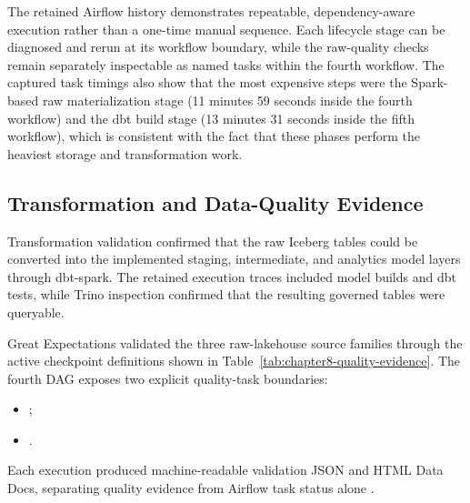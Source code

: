 The retained Airflow history demonstrates repeatable, dependency-aware execution rather than a one-time manual sequence. Each lifecycle stage can be diagnosed and rerun at its workflow boundary, while the raw-quality checks remain separately inspectable as named tasks within the fourth workflow. The captured task timings also show that the most expensive steps were the Spark-based raw materialization stage (11 minutes 59 seconds inside the fourth workflow) and the dbt build stage (13 minutes 31 seconds inside the fifth workflow), which is consistent with the fact that these phases perform the heaviest storage and transformation work.

\subsection*{Transformation and Data-Quality Evidence}
Transformation validation confirmed that the raw Iceberg tables could be converted into the implemented staging, intermediate, and analytics model layers through dbt-spark. The retained execution traces included model builds and dbt tests, while Trino inspection confirmed that the resulting governed tables were queryable.

Great Expectations validated the three raw-lakehouse source families through the active checkpoint definitions shown in Table~\ref{tab:chapter8-quality-evidence}. The fourth DAG exposes two explicit quality-task boundaries:
\begin{itemize}[leftmargin=*,itemsep=0.1em,topsep=0.2em]
    \item {};
    \item {}.
\end{itemize}
Each execution produced machine-readable validation JSON and HTML Data Docs, separating quality evidence from Airflow task status alone \cite{great_expectations_docs,dbt_docs}.

